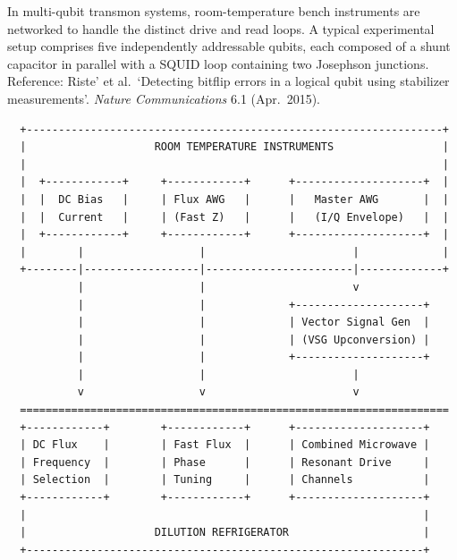 \documentclass[
]{article}
\begin{document}
In multi-qubit transmon systems, room-temperature bench instruments are
networked to handle the distinct drive and read loops. A typical
experimental setup comprises five independently addressable qubits, each
composed of a shunt capacitor in parallel with a SQUID loop containing
two Josephson junctions. Reference: Riste' et al.~`Detecting bitflip
errors in a logical qubit using stabilizer measurements'. \emph{Nature
Communications} 6.1 (Apr.~2015).

\begin{verbatim}
  +-----------------------------------------------------------------+
  |                    ROOM TEMPERATURE INSTRUMENTS                 |
  |                                                                 |
  |  +------------+     +------------+      +--------------------+  |
  |  |  DC Bias   |     | Flux AWG   |      |   Master AWG       |  |
  |  |  Current   |     | (Fast Z)   |      |   (I/Q Envelope)   |  |
  |  +------------+     +------------+      +--------------------+  |
  |        |                  |                       |             |
  +--------|------------------|-----------------------|-------------+
           |                  |                       v
           |                  |             +--------------------+
           |                  |             | Vector Signal Gen  |
           |                  |             | (VSG Upconversion) |
           |                  |             +--------------------+
           |                  |                       |
           v                  v                       v
  ===================================================================
  +------------+        +------------+      +--------------------+
  | DC Flux    |        | Fast Flux  |      | Combined Microwave |
  | Frequency  |        | Phase      |      | Resonant Drive     |
  | Selection  |        | Tuning     |      | Channels           |
  +------------+        +------------+      +--------------------+
  |                                                              |
  |                    DILUTION REFRIGERATOR                     |
  +--------------------------------------------------------------+
\end{verbatim}
\end{document}
